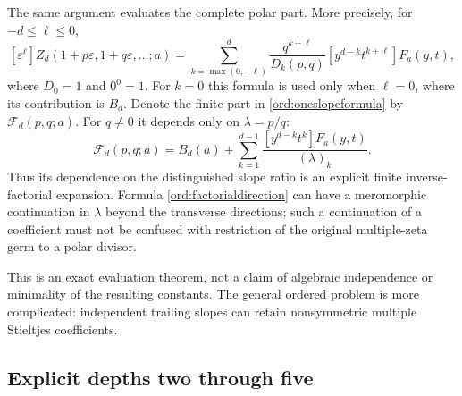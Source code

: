 \documentclass[11pt,letterpaper]{article}
\numberwithin{equation}{section}
\theoremstyle{definition}
\theoremstyle{remark}
\begin{document}
The same argument evaluates the complete polar part. More precisely,
for $-d\le\ell\le0$,
\begin{equation}\label{ord:allnonpositive}
 [\varepsilon^\ell]Z_d(1+p\varepsilon,1+q\varepsilon,\ldots;a)
 =\sum_{k=\max(0,-\ell)}^d
 \frac{q^{k+\ell}}{D_k(p,q)}
 [y^{d-k}t^{k+\ell}]F_a(y,t),
\end{equation}
where $D_0=1$ and $0^0=1$. For $k=0$ this formula is used only
when $\ell=0$, where its contribution is $B_d$.
Denote the finite part in \eqref{ord:oneslopeformula} by
$\mathcal F_d(p,q;a)$. For $q\ne0$ it depends only on $\lambda=p/q$:
\begin{equation}\label{ord:factorialdirection}
 \mathcal F_d(p,q;a)=B_d(a)+
 \sum_{k=1}^{d-1}\frac{[y^{d-k}t^k]F_a(y,t)}{(\lambda)_k}.
\end{equation}
Thus its dependence on the distinguished slope ratio is an explicit
finite inverse-factorial expansion. Formula \eqref{ord:factorialdirection}
can have a meromorphic continuation in $\lambda$ beyond the transverse
directions; such a continuation of a coefficient must not be confused
with restriction of the original multiple-zeta germ to a polar divisor.

This is an exact evaluation theorem, not a claim of algebraic
independence or minimality of the resulting constants. The general
ordered problem is more complicated: independent trailing slopes can
retain nonsymmetric multiple Stieltjes coefficients.

\subsection{Explicit depths two through five}
\end{document}
